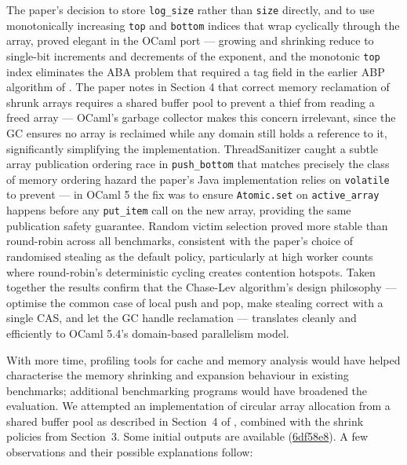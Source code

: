 \documentclass[11pt,a4paper]{article}
\begin{document}
The paper's decision to store \texttt{log\_size} rather than \texttt{size} directly,
and to use monotonically increasing \texttt{top} and \texttt{bottom} indices
that wrap cyclically through the array, proved elegant in the OCaml port —
growing and shrinking reduce to single-bit increments and decrements of the
exponent, and the monotonic \texttt{top} index eliminates the ABA problem that
required a tag field in the earlier ABP algorithm of \cite{arora1998thread}.
The paper notes in Section 4 that correct memory reclamation of shrunk arrays
requires a shared buffer pool to prevent a thief from reading a freed array —
OCaml's garbage collector makes this concern irrelevant, since the GC ensures
no array is reclaimed while any domain still holds a reference
to it, significantly simplifying the implementation. ThreadSanitizer caught a
subtle array publication ordering race in \texttt{push\_bottom} that matches
precisely the class of memory ordering hazard the paper's Java implementation
relies on \texttt{volatile} to prevent — in OCaml 5 the fix was to ensure
\texttt{Atomic.set} on \texttt{active\_array} happens before any \texttt{put\_item}
call on the new array, providing the same publication safety guarantee.
Random victim selection proved more stable than round-robin across all benchmarks,
consistent with the paper's choice of randomised stealing as the default policy,
particularly at high worker counts where round-robin's deterministic cycling
creates contention hotspots. Taken together the results confirm that the
Chase-Lev algorithm's design philosophy — optimise the common case of local push
and pop, make stealing correct with a single CAS, and let the GC handle
reclamation — translates cleanly and efficiently to OCaml 5.4's domain-based
parallelism model.


With more time, profiling tools for cache and memory analysis would have helped
characterise the memory shrinking and expansion behaviour in existing benchmarks;
additional benchmarking programs would have broadened the evaluation.
We attempted an implementation of circular array allocation from a shared buffer
pool as described in Section~4 of \cite{chase2005dynamic}, combined with the
shrink policies from Section~3. Some initial outputs are available
(\href{https://github.com/alinab/work-steal/blob/shared-mem-pool-work/work-steal/outputs/benchmark_plot_fixed_workers.png}{6df58e8}).
A few observations and their possible explanations follow:
\end{document}
